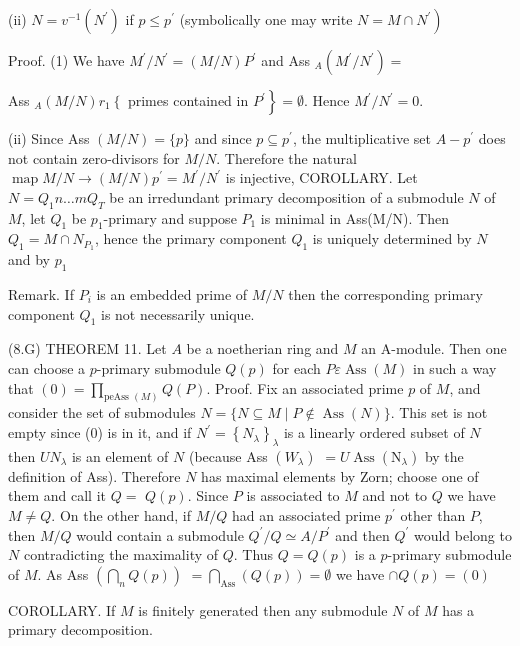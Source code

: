 (ii) $N=v^{-1}\left(N^{\prime}\right)$ if $p \leqslant p^{\prime}$ (symbolically one may write $\left.N=M \cap N^{\prime}\right)$

Proof. (1) We have $M^{\prime} / N^{\prime}=(M / N) P^{\prime}$ and Ass ${ }_{A}\left(M^{\prime} / N^{\prime}\right)=$

Ass $_{A}(M / N) r_{1}\left\{\right.$ primes contained in $\left.P^{\prime}\right\}=\emptyset$. Hence $M^{\prime} / N^{\prime}=0$.

(ii) Since Ass $(M / N)=\{p\}$ and since $p \subseteq p^{\prime}$, the multiplicative set $A-p^{\prime}$ does not contain zero-divisors for $M / N$. Therefore the natural $\operatorname{map} M / N \rightarrow(M / N) p^{\prime}=M^{\prime} / N^{\prime}$ is injective, COROLLARY. Let $N=Q_{1} n \ldots m Q_{T}$ be an irredundant primary decomposition of a submodule $N$ of $M$, let $Q_{1}$ be $p_{1}$-primary and suppose $P_{1}$ is minimal in Ass(M/N). Then $Q_{1}=M \cap N_{P_{1}}$, hence the primary component $Q_{1}$ is uniquely determined by $N$ and by $p_{1}$

Remark. If $P_{i}$ is an embedded prime of $M / N$ then the corresponding primary component $Q_{1}$ is not necessarily unique.

(8.G) THEOREM 11. Let $A$ be a noetherian ring and $M$ an A-module. Then one can choose a $p$-primary submodule $Q(p)$ for each $P \varepsilon \operatorname{Ass}(M)$ in such a way that $(0)=\prod_{\text {peAss }(M)} Q(P)$. Proof. Fix an associated prime $p$ of $M$, and consider the set of submodules $N=\{N \subseteq M \mid P \notin \operatorname{Ass}(N)\}$. This set is not empty since (0) is in it, and if $N^{\prime}=\left\{N_{\lambda}\right\}_{\lambda}$ is a linearly ordered subset of $N$ then $U N_{\lambda}$ is an element of $N$ (because Ass $\left(W_{\lambda}\right)$ $=U \operatorname{Ass}\left(\mathrm{N}_{\lambda}\right)$ by the definition of Ass). Therefore $N$ has maximal elements by Zorn; choose one of them and call it $Q=$ $Q(p)$. Since $P$ is associated to $M$ and not to $Q$ we have $M \neq Q .$ On the other hand, if $M / Q$ had an associated prime $p^{\prime}$ other than $P$, then $M / Q$ would contain a submodule $Q^{\prime} / Q \simeq A / P^{\prime}$ and then $Q^{\prime}$ would belong to $N$ contradicting the maximality of $Q$. Thus $Q=Q(p)$ is a $p$-primary submodule of $M$. As Ass $\left(\bigcap_{n} Q(p)\right)$ $=\bigcap_{\operatorname{Ass}}(Q(p))=\emptyset$ we have $\cap Q(p)=(0)$

COROLLARY. If $M$ is finitely generated then any submodule $N$ of $M$ has a primary decomposition.

